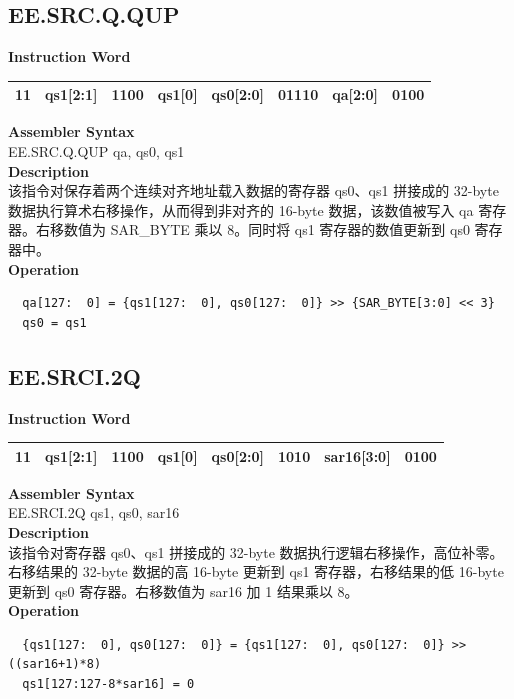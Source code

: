 \clearpage
\subsection{EE.SRC.Q.QUP}\label{instruction:EESRCQQUP}
\setlength\tabcolsep{6pt}
\textbf{Instruction Word} \\
\begin{tabular}{|c|c|c|c|c|c|c|c|}
	\hline
	11 & qs1[2:1] & 1100 & qs1[0] & qs0[2:0] & 01110 & qa[2:0] & 0100 \\
	\hline
\end{tabular}

\textbf{Assembler Syntax} \\
EE.SRC.Q.QUP qa, qs0, qs1 \\
\textbf{Description} \\
该指令对保存着两个连续对齐地址载入数据的寄存器 qs0、qs1 拼接成的 32-byte 数据执行算术右移操作，从而得到非对齐的 16-byte 数据，该数值被写入 qa 寄存器。右移数值为 SAR\_BYTE 乘以 8。同时将 qs1 寄存器的数值更新到 qs0 寄存器中。\\
\textbf{Operation}
\begin{lstlisting}
  qa[127:  0] = {qs1[127:  0], qs0[127:  0]} >> {SAR_BYTE[3:0] << 3}
  qs0 = qs1
\end{lstlisting}

\clearpage
\subsection{EE.SRCI.2Q}\label{instruction:EESRCI2Q}
\setlength\tabcolsep{6pt}
\textbf{Instruction Word} \\
\begin{tabular}{|c|c|c|c|c|c|c|c|}
	\hline
	11 & qs1[2:1] & 1100 & qs1[0] & qs0[2:0] & 1010 & sar16[3:0] & 0100 \\
	\hline
\end{tabular}

\textbf{Assembler Syntax} \\
EE.SRCI.2Q qs1, qs0, sar16 \\
\textbf{Description} \\
该指令对寄存器 qs0、qs1 拼接成的 32-byte 数据执行逻辑右移操作，高位补零。右移结果的 32-byte 数据的高 16-byte 更新到 qs1 寄存器，右移结果的低 16-byte 更新到 qs0 寄存器。右移数值为 sar16 加 1 结果乘以 8。\\
\textbf{Operation}
\begin{lstlisting}
  {qs1[127:  0], qs0[127:  0]} = {qs1[127:  0], qs0[127:  0]} >> ((sar16+1)*8)
  qs1[127:127-8*sar16] = 0
\end{lstlisting}


